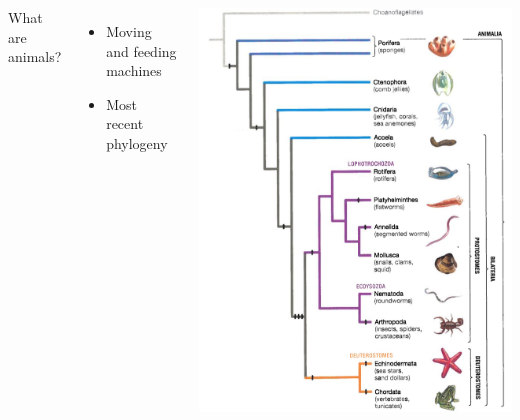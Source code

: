 \begin{frame}
    \begin{adjustwidth}{-2em}{-1.5em}
        \vspace{-4mm}
        \begin{columns}[t]


            What are animals?

            \vspace{5mm}
            \begin{itemize}

                \item Moving and feeding machines

                \vspace{5mm}
                \item Most recent phylogeny

            \end{itemize}


                \vspace{-2mm}
                \includegraphics[height=\textheight]{animal-phylogeny-masked.png}

        \end{columns}
    \end{adjustwidth}

\end{frame}

